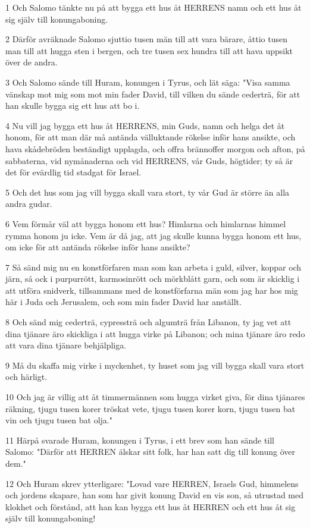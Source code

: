 \par 1 Och Salomo tänkte nu på att bygga ett hus åt HERRENS namn och ett hus åt sig själv till konungaboning.
\par 2 Därför avräknade Salomo sjuttio tusen män till att vara bärare, åttio tusen man till att hugga sten i bergen, och tre tusen sex hundra till att hava uppsikt över de andra.
\par 3 Och Salomo sände till Huram, konungen i Tyrus, och lät säga: "Visa samma vänskap mot mig som mot min fader David, till vilken du sände cederträ, för att han skulle bygga sig ett hus att bo i.
\par 4 Nu vill jag bygga ett hus åt HERRENS, min Guds, namn och helga det åt honom, för att man där må antända välluktande rökelse inför hans ansikte, och hava skådebröden beständigt upplagda, och offra brännoffer morgon och afton, på sabbaterna, vid nymånaderna och vid HERRENS, vår Guds, högtider; ty så är det för evärdlig tid stadgat för Israel.
\par 5 Och det hus som jag vill bygga skall vara stort, ty vår Gud är större än alla andra gudar.
\par 6 Vem förmår väl att bygga honom ett hus? Himlarna och himlarnas himmel rymma honom ju icke. Vem är då jag, att jag skulle kunna bygga honom ett hus, om icke för att antända rökelse inför hans ansikte?
\par 7 Så sänd mig nu en konstförfaren man som kan arbeta i guld, silver, koppar och järn, så ock i purpurrött, karmosinrött och mörkblått garn, och som är skicklig i att utföra snidverk, tillsammans med de konstförfarna män som jag har hos mig här i Juda och Jerusalem, och som min fader David har anställt.
\par 8 Och sänd mig cederträ, cypressträ och algumträ från Libanon, ty jag vet att dina tjänare äro skickliga i att hugga virke på Libanon; och mina tjänare äro redo att vara dina tjänare behjälpliga.
\par 9 Må du skaffa mig virke i myckenhet, ty huset som jag vill bygga skall vara stort och härligt.
\par 10 Och jag är villig att åt timmermännen som hugga virket giva, för dina tjänares räkning, tjugu tusen korer tröskat vete, tjugu tusen korer korn, tjugu tusen bat vin och tjugu tusen bat olja."
\par 11 Härpå svarade Huram, konungen i Tyrus, i ett brev som han sände till Salomo: "Därför att HERREN älskar sitt folk, har han satt dig till konung över dem."
\par 12 Och Huram skrev ytterligare: "Lovad vare HERREN, Israels Gud, himmelens och jordens skapare, han som har givit konung David en vis son, så utrustad med klokhet och förstånd, att han kan bygga ett hus åt HERREN och ett hus åt sig själv till konungaboning!
